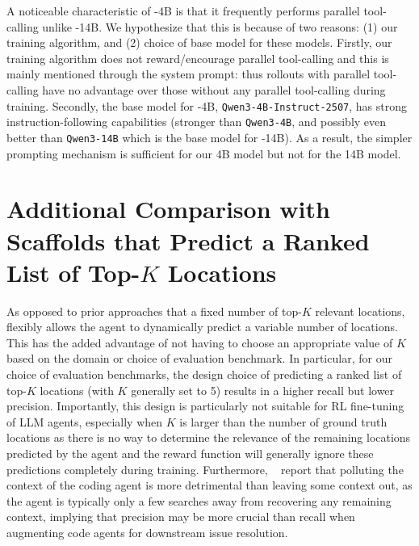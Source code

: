 A noticeable characteristic of \methodname-4B is that it frequently performs parallel tool-calling unlike \methodname-14B. We hypothesize that this is because of two reasons: (1) our training algorithm, and (2) choice of base model for these models. Firstly, our training algorithm does not reward/encourage parallel tool-calling and this is mainly mentioned through the system prompt: thus rollouts with parallel tool-calling have no advantage over those without any parallel tool-calling during training. Secondly, the base model for \methodname-4B, \texttt{Qwen3-4B-Instruct-2507}, has strong instruction-following capabilities (stronger than \texttt{Qwen3-4B}, and possibly even better than \texttt{Qwen3-14B} which is the base model for \methodname-14B). As a result, the simpler prompting mechanism is sufficient for our 4B model but not for the 14B model.

\section{Additional Comparison with Scaffolds that Predict a Ranked List of Top-$K$ Locations}\label{appendix:topk_discussion}
As opposed to prior approaches that a fixed number of top-$K$ relevant locations, \methodname flexibly allows the agent to dynamically predict a variable number of locations. This has the added advantage of not having to choose an appropriate value of $K$ based on the domain or choice of evaluation benchmark. In particular, for our choice of evaluation benchmarks, the design choice of predicting a ranked list of top-$K$ locations (with $K$ generally set to 5) results in a higher recall but lower precision. Importantly, this design is particularly not suitable for RL fine-tuning of LLM agents, especially when $K$ is larger than the number of ground truth locations as there is no way to determine the relevance of the remaining locations predicted by the agent and the reward function will generally ignore these predictions completely during training. Furthermore, ~\citet{cognition2025swegrep} report that polluting the context of the coding agent is more detrimental than leaving some context out, as the agent is typically only a few searches away from recovering any remaining context, implying that precision may be more crucial than recall when augmenting code agents for downstream issue resolution.

